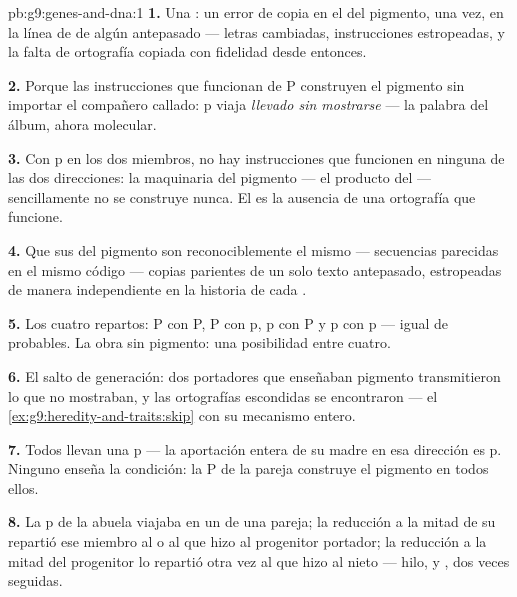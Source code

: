\begin{solution}{pb:g9:genes-and-dna:1}
\textbf{1.} Una : un error de copia en el  del pigmento,
una vez, en la línea de  de algún antepasado --- letras
cambiadas, instrucciones estropeadas, y la falta de ortografía copiada
con fidelidad desde entonces.

\textbf{2.} Porque las instrucciones que funcionan de P construyen el
pigmento sin importar el compañero callado: p viaja \emph{llevado sin
mostrarse} --- la palabra del álbum, ahora molecular.

\textbf{3.} Con p en los dos miembros, no hay instrucciones que
funcionen en ninguna de las dos direcciones: la maquinaria del pigmento
--- el producto del  --- sencillamente no se construye nunca. El
 es la ausencia de una ortografía que funcione.

\textbf{4.} Que sus  del pigmento son reconociblemente el mismo
 --- secuencias parecidas en el mismo código --- copias parientes de
un solo texto antepasado, estropeadas de manera independiente en la
historia de cada .

\textbf{5.} Los cuatro repartos: P con P, P con p, p con P y p con p
--- igual de probables. La obra sin pigmento: una posibilidad entre
cuatro.

\textbf{6.} El salto de generación: dos portadores que enseñaban
pigmento transmitieron lo que no mostraban, y las ortografías
escondidas se encontraron --- el \cref{ex:g9:heredity-and-traits:skip}
con su mecanismo entero.

\textbf{7.} Todos llevan una p --- la aportación entera de su madre en
esa dirección es p. Ninguno enseña la condición: la P de la pareja
construye el pigmento en todos ellos.

\textbf{8.} La p de la abuela viajaba en un  de una pareja; la
reducción a la mitad de su  repartió ese miembro al  o al
 que hizo al progenitor portador; la reducción a la mitad
del progenitor lo repartió otra vez al  que hizo al nieto ---
hilo,  y , dos veces seguidas.


\end{solution}
